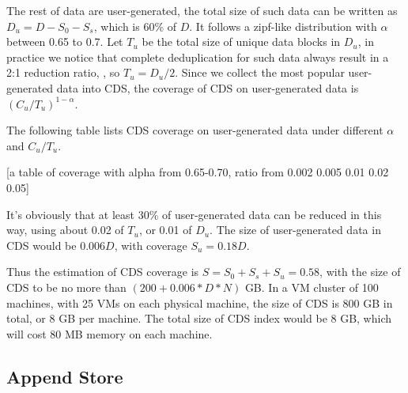 The rest of data are user-generated, the total size of such data can be written as $D_u=D-S_0-S_s$, which is 60\% of $D$. 
It follows a zipf-like distribution with $\alpha$ between 0.65 to 0.7. 
Let $T_u$ be the total size of unique data blocks in $D_u$,
in practice we notice that complete deduplication for such data always result in a 2:1 reduction ratio,
, so $T_u=D_u/2$.
Since we collect the most popular user-generated data into CDS, the coverage of CDS on user-generated data
is $(C_u/T_u)^{1-\alpha}$.

The following table lists CDS coverage on user-generated data under different $\alpha$ and $C_u/T_u$.

[a table of coverage with alpha from 0.65-0.70, ratio from 0.002 0.005 0.01 0.02 0.05]

It's obviously that at least 30\% of user-generated data can be reduced in this way, using about 0.02 of $T_u$, or 0.01 of $D_u$.
The size of user-generated data in CDS would be 0.006$D$, with coverage $S_u=0.18D$.

Thus the estimation of CDS coverage is $S=S_0+S_s+S_u=0.58$, with the size of CDS to be no more than $(200 + 0.006*D*N)$ GB.
In a VM cluster of 100 machines, with 25 VMs on each physical machine, the size of CDS is 800 GB in total, or 8 GB per machine.
The total size of CDS index would be 8 GB, which will cost 80 MB memory on each machine. 
\subsection{Append Store}

